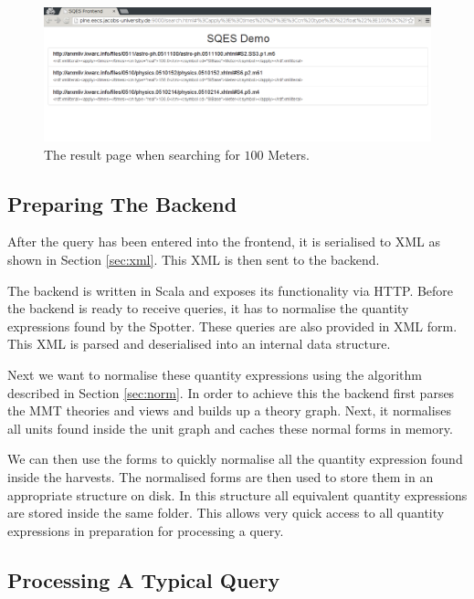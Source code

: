 \begin{figure}
  \begin{center}
    \includegraphics[width=\textwidth]{img/res1.png}
  \end{center}
  \caption{The result page when searching for $100$ Meters. }
  \label{fig:frontres}
\end{figure}

\subsection{Preparing The Backend}

After the query has been entered into the frontend, it is serialised to XML as shown in Section \ref{sec:xml}. This XML is then sent to the backend.

The backend is written in Scala and exposes its functionality via HTTP. Before the backend is ready to receive queries, it has to normalise the quantity expressions found by the Spotter. These queries are also provided in XML form. This XML is parsed and deserialised into an internal data structure.

Next we want to normalise these quantity expressions using the algorithm described in Section \ref{sec:norm}. In order to achieve this the backend first parses the MMT theories and views and builds up a theory graph. Next, it normalises all units found inside the unit graph and caches these normal forms in memory.

We can then use the forms to quickly normalise all the quantity expression found inside the harvests. The normalised forms are then used to store them in an appropriate structure on disk. In this structure all equivalent quantity expressions are stored inside the same folder. This allows very quick access to all quantity expressions in preparation for processing a query.

\subsection{Processing A Typical Query}


